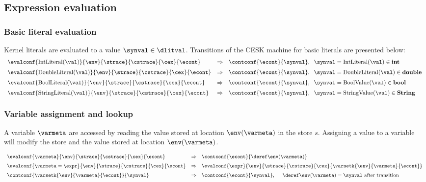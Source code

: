 \documentclass{article}
\begin{document}
\subsection{Expression evaluation}
\label{subsec:expr-evaluation}
\subsubsection{Basic literal evaluation}
\label{subsubsec:basic-literal-eval}
Kernel literals are evaluated to a value $\synval \in \dlitval$. Transitions of the CESK machine for basic literals are presented below:
\[
  \begin{array}{lcll}
	\evalconf{\mathrm{IntLiteral(\val)}}{\env}{\strace}{\cstrace}{\cex}{\econt}
	& \Rightarrow &
	\contconf{\econt}{\synval},
	\hspace{2mm}\synval = \mathrm{IntLiteral(\val)} \in \mathbf{int}\\[2mm]

	\evalconf{\mathrm{DoubleLiteral(\val)}}{\env}{\strace}{\cstrace}{\cex}{\econt}
	& \Rightarrow &
	\contconf{\econt}{\synval},
	\hspace{2mm}\synval = \mathrm{DoubleLiteral(\val)} \in \mathbf{double}\\[2mm]

	\evalconf{\mathrm{BoolLiteral(\val)}}{\env}{\strace}{\cstrace}{\cex}{\econt}
	& \Rightarrow &
	\contconf{\econt}{\synval},
	\hspace{2mm}\synval = \mathrm{BoolValue(\val)} \in \mathbf{bool}\\[2mm]

	\evalconf{\mathrm{StringLiteral(\val)}}{\env}{\strace}{\cstrace}{\cex}{\econt}
	& \Rightarrow &
	\contconf{\econt}{\synval},
	\hspace{2mm}\synval = \mathrm{StringValue(\val)} \in \mathbf{String}

  \end{array}
\]

\subsubsection{Variable assignment and lookup}
\label{subsubsec:variable-assignment-and-lookup}
A variable $\varmeta$ are accessed by reading the value stored at location $\env(\varmeta)$ in the store $s$. Assigning a value to a variable will modify the store and the value stored at location  $\env(\varmeta)$.

\[
  \begin{array}{lcl}
	\evalconf{\varmeta}{\env}{\strace}{\cstrace}{\cex}{\econt}
	& \Rightarrow &
	\contconf{\econt}{\deref\env(\varmeta)}\\[2mm]

	\evalconf{\varmeta = \expr}{\env}{\strace}{\cstrace}{\cex}{\econt}
	& \Rightarrow &
	\evalconf{\expr}{\env}{\strace}{\cstrace}{\cex}{\varsetk{\env}{\varmeta}{\econt}}\\[2mm]

	\contconf{\varsetk{\env}{\varmeta}{\econt}}{\synval}
	& \Rightarrow &
	\contconf{\econt}{\synval}, \hspace{5mm} \deref\env(\varmeta) = \synval \textrm{ after transition}

  \end{array}
\]
\end{document}
